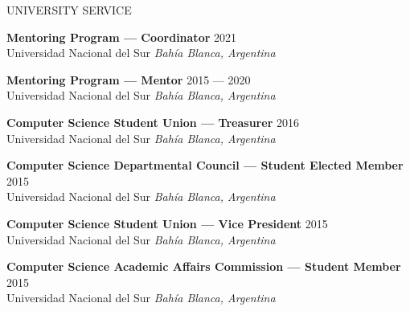 \documentclass{resume} %
\begin{document}



\begin{rSection}{UNIVERSITY SERVICE}

\item \textbf{Mentoring Program --- Coordinator} \hfill  2021\\
Universidad Nacional del Sur \hfill \textit{Bahía Blanca, Argentina}

\item \textbf{Mentoring Program --- Mentor} \hfill  2015 --- 2020\\
Universidad Nacional del Sur \hfill \textit{Bahía Blanca, Argentina}

\item \textbf{Computer Science Student Union --- Treasurer} \hfill  2016\\
Universidad Nacional del Sur \hfill \textit{Bahía Blanca, Argentina}

\item \textbf{Computer Science Departmental Council --- Student Elected Member} \hfill  2015\\
Universidad Nacional del Sur \hfill \textit{Bahía Blanca, Argentina}

\item \textbf{Computer Science Student Union --- Vice President} \hfill  2015\\
Universidad Nacional del Sur \hfill \textit{Bahía Blanca, Argentina}

\item \textbf{Computer Science Academic Affairs Commission --- Student Member} \hfill  2015\\
Universidad Nacional del Sur \hfill \textit{Bahía Blanca, Argentina}

\end{rSection}
\end{document}
